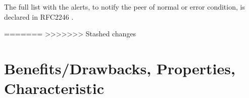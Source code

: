 The full list with the alerts, to notify the peer of normal or error condition, is declared in RFC2246 \cite{rfc2246}. \cite{W.Stalling} \cite{ms:overview}

=======
>>>>>>> Stashed changes
\section{Benefits/Drawbacks, Properties, Characteristic}
\label{sec:introduction_suggestions}




